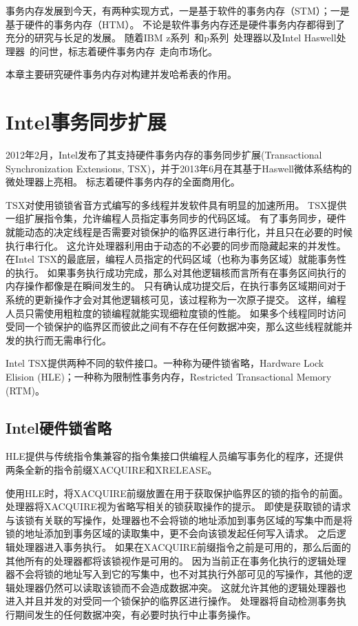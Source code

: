 事务内存发展到今天，有两种实现方式，一是基于软件的事务内存（STM）；一是基于硬件的事务内存（HTM）。
不论是软件事务内存\cite{spear2010lightweight,saha2006mcrt,shavit1997software}还是硬件事务内存\cite{yen2007logtm,moore2006logtm,dalessandro2011hybrid}都得到了充分的研究与长足的发展。
随着IBM z系列~\cite{Cain2013Robust}和p系列~\cite{Wang2012Evaluation}处理器以及Intel Haswell处理器~\cite{Intel2015Intel}的问世，标志着硬件事务内存~\cite{Herlihy1993Transactional}走向市场化。

本章主要研究硬件事务内存对构建并发哈希表的作用。

\section{Intel事务同步扩展}
2012年2月，Intel发布了其支持硬件事务内存的事务同步扩展(Transactional Synchronization Extensions, TSX)，并于2013年6月在其基于Haswell微体系结构的微处理器上亮相。
标志着硬件事务内存的全面商用化。

TSX对使用锁锁省音方式编写的多线程并发软件具有明显的加速所用。 
TSX提供一组扩展指令集，允许编程人员指定事务同步的代码区域。
有了事务同步，硬件就能动态的决定线程是否需要对锁保护的临界区进行串行化，并且只在必要的时候执行串行化。
这允许处理器利用由于动态的不必要的同步而隐藏起来的并发性。
在Intel TSX的最底层，编程人员指定的代码区域（也称为事务区域）就能事务性的执行。
如果事务执行成功完成，那么对其他逻辑核而言所有在事务区间执行的内存操作都像是在瞬间发生的。
只有确认成功提交后，在执行事务区域期间对于系统的更新操作才会对其他逻辑核可见，该过程称为一次原子提交。
这样，编程人员只需使用粗粒度的锁编程就能实现细粒度锁的性能。
如果多个线程同时访问受同一个锁保护的临界区而彼此之间有不存在任何数据冲突，那么这些线程就能并发的执行而无需串行化。

Intel TSX提供两种不同的软件接口。一种称为硬件锁省略，Hardware Lock Elision (HLE)；一种称为限制性事务内存，Restricted Transactional Memory (RTM)。

\subsection{Intel硬件锁省略}
HLE提供与传统指令集兼容的指令集接口供编程人员编写事务化的程序，还提供两条全新的指令前缀XACQUIRE和XRELEASE。

使用HLE时，将XACQUIRE前缀放置在用于获取保护临界区的锁的指令的前面。
处理器将XACQUIRE视为省略写相关的锁获取操作的提示。
即使是获取锁的请求与该锁有关联的写操作，处理器也不会将锁的地址添加到事务区域的写集中而是将锁的地址添加到事务区域的读取集中，更不会向该锁发起任何写入请求。
之后逻辑处理器进入事务执行。
如果在XACQUIRE前缀指令之前是可用的，那么后面的其他所有的处理器都将该锁视作是可用的。
因为当前正在事务化执行的逻辑处理器不会将锁的地址写入到它的写集中，也不对其执行外部可见的写操作，其他的逻辑处理器仍然可以读取该锁而不会造成数据冲突。
这就允许其他的逻辑处理器也进入并且并发的对受同一个锁保护的临界区进行操作。
处理器将自动检测事务执行期间发生的任何数据冲突，有必要时执行中止事务操作。

